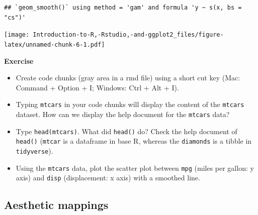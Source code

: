 \documentclass[]{book}
\begin{document}
\begin{verbatim}
## `geom_smooth()` using method = 'gam' and formula 'y ~ s(x, bs = "cs")'
\end{verbatim}

\texttt{[image: Introduction-to-R,-Rstudio,-and-ggplot2\_files/figure-latex/unnamed-chunk-6-1.pdf]}

\textbf{Exercise}

\begin{itemize}
\item
  Create code chunks (gray area in a rmd file) using a short cut key (Mac: Command + Option + I; Windows: Ctrl + Alt + I).
\item
  Typing \texttt{mtcars} in your code chunks will display the content of the \texttt{mtcars} dataset. How can we display the help document for the \texttt{mtcars} data?
\item
  Type \texttt{head(mtcars)}. What did \texttt{head()} do? Check the help document of \texttt{head()} (\texttt{mtcar} is a dataframe in base R, whereas the \texttt{diamonds} is a tibble in \texttt{tidyverse}).
\item
  Using the \texttt{mtcars} data, plot the scatter plot between \texttt{mpg} (miles per gallon: y axis) and \texttt{disp} (displacement: x axis) with a smoothed line.
\end{itemize}

\hypertarget{aesthetic-mappings}{%
\subsection{Aesthetic mappings}\label{aesthetic-mappings}}
\end{document}
